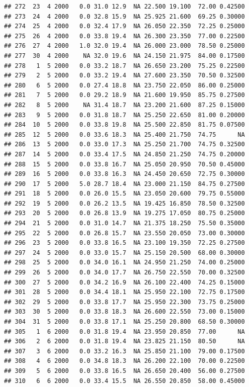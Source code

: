 \documentclass[
]{book}
\begin{document}
\begin{verbatim}
## 272  23  4 2000   0.0 31.0 12.9  NA 22.500 19.100  72.00 0.42500
## 273  24  4 2000   0.0 32.8 15.9  NA 25.925 21.600  69.25 0.30000
## 274  25  4 2000   0.0 32.4 17.9  NA 26.050 22.350  72.25 0.25000
## 275  26  4 2000   0.0 33.8 19.4  NA 26.300 23.350  77.00 0.22500
## 276  27  4 2000   1.0 32.0 19.4  NA 26.000 23.000  78.50 0.25000
## 277  30  4 2000    NA 32.0 19.6  NA 24.150 21.975  84.00 0.17500
## 278   1  5 2000   0.0 33.2 18.7  NA 26.650 23.200  75.25 0.22500
## 279   2  5 2000   0.0 33.2 19.4  NA 27.600 23.350  70.50 0.32500
## 280   6  5 2000   0.0 27.4 18.8  NA 23.750 22.050  86.00 0.25000
## 281   7  5 2000   0.0 29.2 18.9  NA 21.600 19.950  85.75 0.27500
## 282   8  5 2000    NA 31.4 18.7  NA 23.200 21.600  87.25 0.15000
## 283   9  5 2000   0.0 31.8 18.7  NA 25.250 22.650  81.00 0.20000
## 284  10  5 2000   0.0 33.8 19.8  NA 25.500 22.850  81.75 0.07500
## 285  12  5 2000   0.0 33.6 18.3  NA 25.400 21.750  74.75      NA
## 286  13  5 2000   0.0 33.0 17.3  NA 25.250 21.700  74.75 0.32500
## 287  14  5 2000   0.0 33.4 17.5  NA 24.850 21.250  74.75 0.20000
## 288  15  5 2000   0.0 33.8 16.7  NA 25.050 20.950  70.50 0.45000
## 289  16  5 2000   0.0 33.8 16.3  NA 24.450 20.650  72.75 0.30000
## 290  17  5 2000   5.0 28.7 18.4  NA 23.000 21.150  84.75 0.27500
## 291  18  5 2000   0.0 26.0 15.5  NA 23.050 20.600  79.75 0.55000
## 292  19  5 2000   0.0 26.2 13.5  NA 19.425 16.850  78.50 0.32500
## 293  20  5 2000   0.0 26.8 13.9  NA 19.275 17.050  80.75 0.25000
## 294  21  5 2000   0.0 31.0 14.7  NA 21.375 18.250  75.50 0.35000
## 295  22  5 2000   0.0 26.8 15.7  NA 23.550 20.050  73.00 0.30000
## 296  23  5 2000   0.0 33.8 16.5  NA 23.100 19.350  72.25 0.27500
## 297  24  5 2000   0.0 33.0 15.7  NA 25.150 20.500  68.00 0.30000
## 298  25  5 2000   0.0 34.0 16.1  NA 24.950 21.250  74.00 0.25000
## 299  26  5 2000   0.0 34.0 17.7  NA 26.750 22.550  70.00 0.32500
## 300  27  5 2000   0.0 34.2 16.9  NA 26.100 22.400  74.25 0.15000
## 301  28  5 2000   0.0 34.4 18.1  NA 25.950 22.100  72.75 0.17500
## 302  29  5 2000   0.0 33.8 17.7  NA 25.950 22.300  73.75 0.25000
## 303  30  5 2000   0.0 33.8 18.3  NA 26.600 22.550  73.00 0.15000
## 304  31  5 2000   0.0 33.8 17.1  NA 25.250 20.800  68.50 0.30000
## 305   1  6 2000   0.0 31.8 19.4  NA 23.950 20.850  77.00      NA
## 306   2  6 2000   0.0 31.8 19.4  NA 23.825 21.150  80.50      NA
## 307   3  6 2000   0.0 33.2 16.3  NA 25.850 21.100  79.00 0.17500
## 308   4  6 2000   0.0 34.8 18.3  NA 26.200 22.100  70.00 0.22500
## 309   5  6 2000   0.0 33.8 16.5  NA 26.650 20.400  56.00 0.27500
## 310   6  6 2000   0.0 33.4 15.5  NA 26.550 20.850  58.00 0.45000

\end{verbatim}
\end{document}
